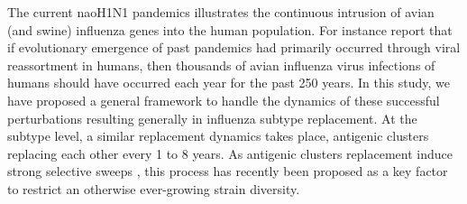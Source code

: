 %

%

The current naoH1N1 pandemics illustrates the continuous intrusion of
avian (and swine) influenza genes into the human population. For
instance \citet{Day2006} report that if evolutionary emergence of past
pandemics had primarily occurred through viral reassortment in humans,
then thousands of avian influenza virus infections of humans should
have occurred each year for the past 250 years. In this study, we have
proposed a general framework to handle the dynamics of these
successful perturbations resulting generally in influenza subtype
replacement.
%
At the subtype level, a similar replacement dynamics takes place,
antigenic clusters replacing each other every 1 to 8 years. As
antigenic clusters replacement induce strong selective sweeps
\citep{Koelle2006, Rambaut2008}, this process has recently been
proposed as a key factor to restrict an otherwise ever-growing strain
diversity.

